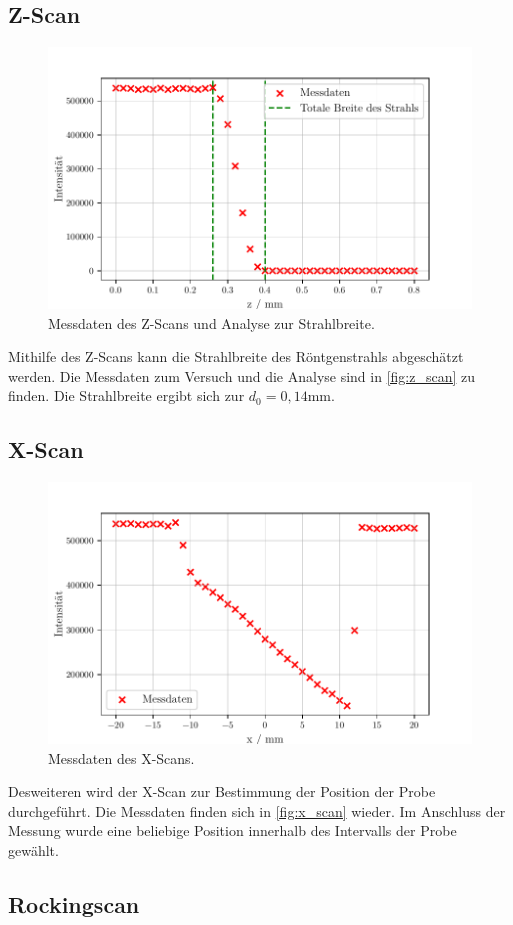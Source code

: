 \subsection{Z-Scan}

\begin{figure}
    \centering
    \includegraphics[width = 0.5 \linewidth]{build/z_scan.pdf}
    \caption{Messdaten des Z-Scans und Analyse zur Strahlbreite.}
    \label{fig:z_scan}
\end{figure}

Mithilfe des Z-Scans kann die Strahlbreite des Röntgenstrahls abgeschätzt werden.
Die Messdaten zum Versuch und die Analyse sind in \autoref{fig:z_scan} zu finden.
Die Strahlbreite ergibt sich zur $d_0 = 0{,}14 \unit{\milli\meter}$.

\subsection{X-Scan}

\begin{figure}
    \centering
    \includegraphics[width = 0.5 \linewidth]{build/x_scan.pdf}
    \caption{Messdaten des X-Scans.}
    \label{fig:x_scan}
\end{figure}

Desweiteren wird der X-Scan zur Bestimmung der Position der Probe durchgeführt.
Die Messdaten finden sich in \autoref{fig:x_scan} wieder.
Im Anschluss der Messung wurde eine beliebige Position innerhalb des Intervalls der Probe gewählt.

\subsection{Rockingscan}

